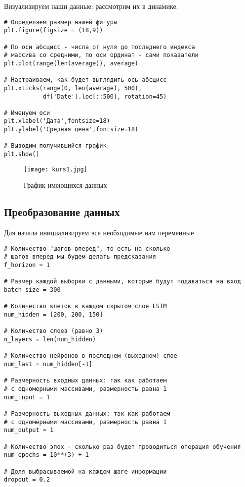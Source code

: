 \documentclass[12pt, a4paper]{article}
\begin{document}
Визуализируем наши данные: рассмотрим их в динамике.

\begin{verbatim}
# Определяем размер нашей фигуры
plt.figure(figsize = (18,9))

# По оси абсцисс - числа от нуля до последнего индекса
# массива со средними, по оси ординат - сами показатели
plt.plot(range(len(average)), average)

# Настраиваем, как будет выглядить ось абсцисс
plt.xticks(range(0, len(average), 500),
           df['Date'].loc[::500], rotation=45)

# Именуем оси
plt.xlabel('Дата',fontsize=18)
plt.ylabel('Средняя цена',fontsize=18)

# Выводим получившийся график
plt.show()
\end{verbatim}

\begin{figure}[h]
    \centering
    \texttt{[image: kurs1.jpg]}
		\caption{График имеющихся данных}
\end{figure}

\subsection{Преобразование данных}

Для начала инициализируем все необходимые нам переменные.

\begin{verbatim}
# Количество "шагов вперед", то есть на сколько
# шагов вперед мы будем делать предсказания
f_horizon = 1

# Размер каждой выборки с данными, которые будут подаваться на вход
batch_size = 300

# Количество клеток в каждом скрытом слое LSTM
num_hidden = [200, 200, 150]

# Количество слоев (равно 3)
n_layers = len(num_hidden)

# Количество нейронов в последнем (выходном) слое
num_last = num_hidden[-1]

# Размерность входных данных: так как работаем
# с одномерными массивами, размерность равна 1
num_input = 1

# Размерность выходных данных: так как работаем
# с одномерными массивами, размерность равна 1
num_output = 1

# Количество эпох - сколько раз будет проводиться операция обучения
num_epochs = 10**(3) + 1

# Доля выбрасываемой на каждом шаге информации
dropout = 0.2
\end{verbatim}
\end{document}
